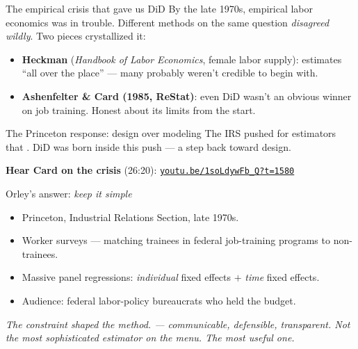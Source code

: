 \documentclass[aspectratio=169,11pt]{beamer}
\begin{document}
\begin{frame}{The empirical crisis that gave us DiD}
\vspace{-0.4em}
\footnotesize
By the late 1970s, empirical labor economics was in trouble. Different methods on the same question \textit{disagreed wildly}. Two pieces crystallized it:
\begin{itemize}
  \item \textbf{Heckman} (\textit{Handbook of Labor Economics}, female labor supply): estimates ``all over the place'' --- many probably weren't credible to begin with.
  \item \textbf{Ashenfelter \& Card (1985, ReStat)}: even DiD wasn't an obvious winner on job training. Honest about its limits from the start.
\end{itemize}
\begin{block}{The Princeton response: design over modeling}
The IRS pushed for estimators that . DiD was born inside this push --- a step back toward design.
\end{block}
\textbf{Hear Card on the crisis} (26:20): \href{https://youtu.be/1soLdywFb_Q?si=BCVqYeRz6jYiwHTQ&t=1580}{\color{ocean}\texttt{youtu.be/1soLdywFb\_Q?t=1580}}
\end{frame}

\begin{frame}{Orley's answer: \textit{keep it simple}}
\vspace{0.4em}
\begin{itemize}
  \item Princeton, Industrial Relations Section, late 1970s.
  \item Worker surveys --- matching trainees in federal job-training programs to non-trainees.
  \item Massive panel regressions: \textit{individual} fixed effects $+$ \textit{time} fixed effects.
  \item Audience: federal labor-policy bureaucrats who held the budget.
\end{itemize}
\vspace{0.5em}
\vspace{0.3em}
\begin{center}
\small\color{warmgray}\itshape
The constraint shaped the method. \; --- communicable, defensible, transparent. \;Not the most sophisticated estimator on the menu. \;The most useful one.
\end{center}
\end{frame}
\end{document}
